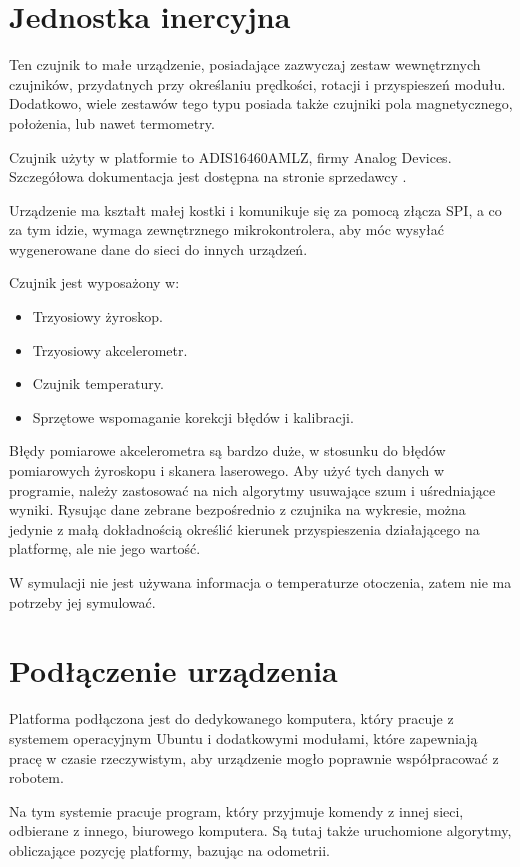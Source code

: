 \section{Jednostka inercyjna}
	Ten czujnik to małe urządzenie, posiadające zazwyczaj zestaw wewnętrznych czujników, przydatnych przy określaniu prędkości, rotacji i przyspieszeń modułu.
	Dodatkowo, wiele zestawów tego typu posiada także czujniki pola magnetycznego, położenia, lub nawet termometry.
	
	Czujnik użyty w platformie to ADIS16460AMLZ, firmy Analog Devices. Szczegółowa dokumentacja jest dostępna na stronie sprzedawcy \cite{adis_website}.
	
	Urządzenie ma kształt małej kostki i komunikuje się za pomocą złącza SPI, a co za tym idzie, wymaga zewnętrznego mikrokontrolera, aby móc wysyłać wygenerowane dane
	do sieci do innych urządzeń.
	
	Czujnik jest wyposażony w:
	\begin{itemize}
		\item Trzyosiowy żyroskop.
		\item Trzyosiowy akcelerometr.
		\item Czujnik temperatury.
		\item Sprzętowe wspomaganie korekcji błędów i kalibracji.
	\end{itemize}
	
	Błędy pomiarowe akcelerometra są bardzo duże, w stosunku do błędów pomiarowych żyroskopu i skanera laserowego. 
	Aby użyć tych danych w programie, należy zastosować na nich algorytmy usuwające szum i uśredniające wyniki.
	Rysując dane zebrane bezpośrednio z czujnika na wykresie, można jedynie z małą dokładnością określić kierunek przyspieszenia działającego na platformę, ale nie jego 
	wartość.
	
	W symulacji nie jest używana informacja o temperaturze otoczenia, zatem nie ma potrzeby jej symulować.
	
\section{Podłączenie urządzenia}
	Platforma podłączona jest do dedykowanego komputera, który pracuje z systemem operacyjnym Ubuntu i dodatkowymi modułami, które zapewniają 
	pracę w czasie rzeczywistym, aby urządzenie mogło poprawnie współpracować z robotem.
	
	Na tym systemie pracuje program, który przyjmuje komendy z innej sieci, odbierane z innego, biurowego komputera.
	Są tutaj także uruchomione algorytmy, obliczające pozycję platformy, bazując na odometrii.
	
